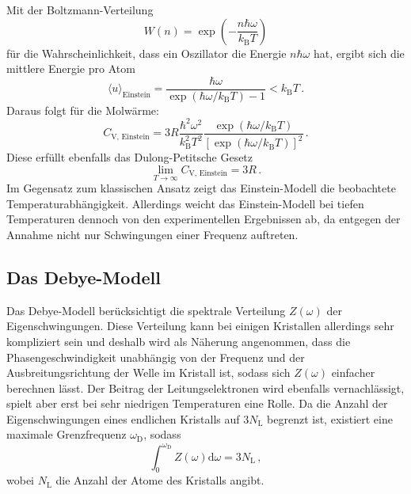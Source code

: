 Mit der Boltzmann-Verteilung
\begin{equation*}
  W(n) = \exp\left( -\frac{n\hbar\omega}{k_\text{B}T} \right)
\end{equation*}
für die Wahrscheinlichkeit, dass ein Oszillator die Energie $n\hbar\omega$ hat, ergibt sich die mittlere Energie pro Atom
\begin{equation}
  \langle u \rangle_\text{Einstein} = \frac{\hbar\omega}{\exp(\hbar\omega/k_\text{B}T) - 1} < k_\text{B}T \,.
\end{equation}
Daraus folgt für die Molwärme:
\begin{equation}
  C_\text{V, Einstein} = 3R\frac{\hbar^2\omega^2}{k_\text{B}^2T^2}
                          \frac{\exp(\hbar\omega/k_\text{B}T)}{\left[\exp(\hbar\omega/k_\text{B}T)\right]^2} \,.
\end{equation}
Diese erfüllt ebenfalls das Dulong-Petitsche Gesetz
\begin{equation*}
  \lim_{T\to\infty} C_\text{V, Einstein} = 3R\,.
\end{equation*}
Im Gegensatz zum klassischen Ansatz zeigt das Einstein-Modell die beobachtete Temperaturabhängigkeit. Allerdings weicht das
Einstein-Modell bei tiefen Temperaturen dennoch von den experimentellen Ergebnissen ab, da entgegen der Annahme
nicht nur Schwingungen einer Frequenz auftreten.

\subsection{Das Debye-Modell}
Das Debye-Modell berücksichtigt die spektrale Verteilung $Z(\omega)$ der Eigenschwingungen. Diese Verteilung kann bei einigen
Kristallen allerdings sehr kompliziert sein und deshalb wird als Näherung angenommen, dass die Phasengeschwindigkeit
unabhängig von der Frequenz und der Ausbreitungsrichtung der Welle im Kristall ist, sodass sich $Z(\omega)$ einfacher berechnen lässt.
Der Beitrag der Leitungselektronen wird ebenfalls vernachlässigt, spielt aber erst bei sehr niedrigen Temperaturen eine Rolle.
Da die Anzahl der Eigenschwingungen eines endlichen Kristalls auf $3N_\text{L}$ begrenzt ist, existiert eine maximale Grenzfrequenz $\omega_\text{D}$,
sodass
\begin{equation}
  \int_0^{\omega_\text{D}} Z(\omega)\text{d}\omega = 3N_\text{L}\,,
  \label{eq:konv}
\end{equation}
wobei $N_\text{L}$ die Anzahl der Atome des Kristalls angibt.

